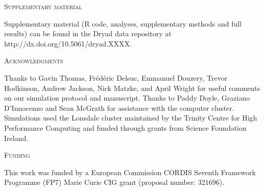 \documentclass[12pt,letterpaper]{article}
\renewcommand{\section}[1]{%
\bigskip
\begin{center}
\begin{Large}
\normalfont\scshape #1
\medskip
\end{Large}
\end{center}}
\begin{document}
%
%
\section{Supplementary material}
Supplementary material (R code, analyses, supplementary methods and full results) can be found in the Dryad data repository at http://dx.doi.org/10.5061/dryad.XXXX.

\section{Acknowledgments}
Thanks to Gavin Thomas, Fr\'{e}d\'{e}ric Delsuc, Emmanuel Douzery, Trevor Hodkinson, Andrew Jackson, Nick Matzke, and April Wright for useful comments on our simulation protocol and manuscript. Thanks to Paddy Doyle, Graziano D'Innocenzo and Sean McGrath for assistance with the computer cluster. Simulations used the Lonsdale cluster maintained by the Trinity Centre for High Performance Computing and funded through grants from Science Foundation Ireland. 

\section{Funding}
This work was funded by a European Commission CORDIS Seventh Framework Programme (FP7) Marie Curie CIG grant (proposal number: 321696).






%
%

\end{document}
